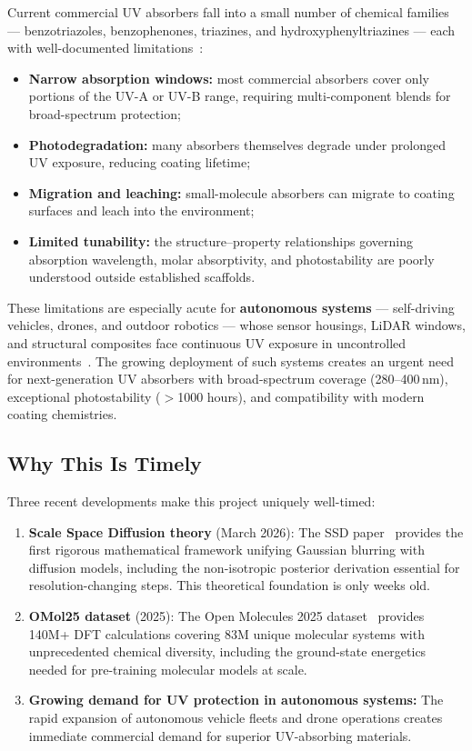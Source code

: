 \documentclass[11pt,a4paper]{article}
\begin{document}
Current commercial UV absorbers fall into a small number of chemical families ---
benzotriazoles, benzophenones, triazines, and hydroxyphenyltriazines --- each with
well-documented limitations~\citep{bojinov2012photostabilizers,cantrell2012uv}:
\begin{itemize}[leftmargin=*]
  \item \textbf{Narrow absorption windows:} most commercial absorbers cover only portions
    of the UV-A or UV-B range, requiring multi-component blends for broad-spectrum
    protection;
  \item \textbf{Photodegradation:} many absorbers themselves degrade under prolonged UV
    exposure, reducing coating lifetime;
  \item \textbf{Migration and leaching:} small-molecule absorbers can migrate to coating
    surfaces and leach into the environment;
  \item \textbf{Limited tunability:} the structure--property relationships governing
    absorption wavelength, molar absorptivity, and photostability are poorly understood
    outside established scaffolds.
\end{itemize}

These limitations are especially acute for \textbf{autonomous systems} --- self-driving
vehicles, drones, and outdoor robotics --- whose sensor housings, LiDAR windows, and
structural composites face continuous UV exposure in uncontrolled
environments~\citep{akay2024autonomous}. The growing deployment of such systems creates
an urgent need for next-generation UV absorbers with broad-spectrum coverage
(280--400\,nm), exceptional photostability ($>$1000 hours), and compatibility with
modern coating chemistries.

\subsection{Why This Is Timely}

Three recent developments make this project uniquely well-timed:

\begin{enumerate}[leftmargin=*]
  \item \textbf{Scale Space Diffusion theory} (March 2026): The SSD
    paper~\citep{ssd2026} provides the first rigorous mathematical framework unifying
    Gaussian blurring with diffusion models, including the non-isotropic posterior
    derivation essential for resolution-changing steps. This theoretical foundation is
    only weeks old.

  \item \textbf{OMol25 dataset} (2025): The Open Molecules 2025 dataset~\citep{omol25}
    provides 140M+ DFT calculations covering 83M unique molecular systems with
    unprecedented chemical diversity, including the ground-state energetics needed for
    pre-training molecular models at scale.

  \item \textbf{Growing demand for UV protection in autonomous systems:} The rapid
    expansion of autonomous vehicle fleets and drone operations creates immediate
    commercial demand for superior UV-absorbing materials.
\end{enumerate}
\end{document}
